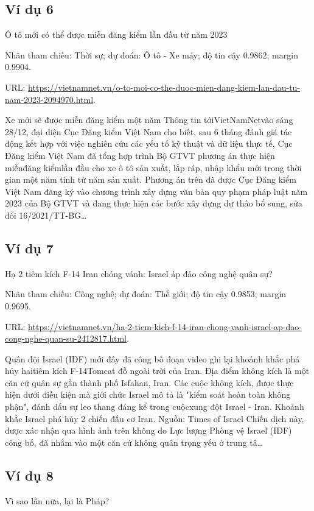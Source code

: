 \subsection{Ví dụ 6}
Ô tô mới có thể được miễn đăng kiểm lần đầu từ năm 2023

\noindent Nhãn tham chiếu: Thời sự; dự đoán: Ô tô - Xe máy; độ tin cậy 0.9862; margin 0.9904.

\noindent URL: \url{https://vietnamnet.vn/o-to-moi-co-the-duoc-mien-dang-kiem-lan-dau-tu-nam-2023-2094970.html}.

Xe mới sẽ được miễn đăng kiểm một năm Thông tin tớiVietNamNetvào sáng 28/12, đại diện Cục Đăng kiểm Việt Nam cho biết, sau 6 tháng đánh giá tác động kết hợp với việc nghiên cứu các yếu tố kỹ thuật và dữ liệu thực tế, Cục Đăng kiểm Việt Nam đã tổng hợp trình Bộ GTVT phương án thực hiện miễnđăng kiểmlần đầu cho xe ô tô sản xuất, lắp ráp, nhập khẩu mới trong thời gian một năm tính từ năm sản xuất. Phương án trên đã được Cục Đăng kiểm Việt Nam đăng ký vào chương trình xây dựng văn bản quy phạm pháp luật năm 2023 của Bộ GTVT và đang thực hiện các bước xây dựng dự thảo bổ sung, sửa đổi 16/2021/TT-BG\ldots

\subsection{Ví dụ 7}
Hạ 2 tiêm kích F-14 Iran chóng vánh: Israel áp đảo công nghệ quân sự?

\noindent Nhãn tham chiếu: Công nghệ; dự đoán: Thế giới; độ tin cậy 0.9853; margin 0.9695.

\noindent URL: \url{https://vietnamnet.vn/ha-2-tiem-kich-f-14-iran-chong-vanh-israel-ap-dao-cong-nghe-quan-su-2412817.html}.

Quân đội Israel (IDF) mới đây đã công bố đoạn video ghi lại khoảnh khắc phá hủy haitiêm kích F-14Tomcat đỗ ngoài trời của Iran. Địa điểm không kích là một căn cứ quân sự gần thành phố Isfahan, Iran. Các cuộc không kích, được thực hiện dưới điều kiện mà giới chức Israel mô tả là "kiểm soát hoàn toàn không phận", đánh dấu sự leo thang đáng kể trong cuộcxung đột Israel - Iran. Khoảnh khắc Israel phá hủy 2 chiến đấu cơ Iran. Nguồn: Times of Israel Chiến dịch này, được xác nhận qua hình ảnh trên không do Lực lượng Phòng vệ Israel (IDF) công bố, đã nhắm vào một căn cứ không quân trọng yếu ở trung tâ\ldots

\subsection{Ví dụ 8}
Vì sao lần nữa, lại là Pháp?

